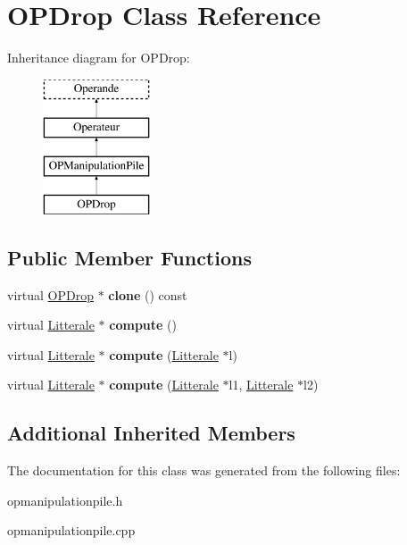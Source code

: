 \hypertarget{class_o_p_drop}{}\section{O\+P\+Drop Class Reference}
\label{class_o_p_drop}
Inheritance diagram for O\+P\+Drop\+:\begin{figure}[H]
\begin{center}
\leavevmode
\includegraphics[height=4.000000cm]{class_o_p_drop}
\end{center}
\end{figure}
\subsection*{Public Member Functions}
\begin{DoxyCompactItemize}
\item 
virtual \hyperlink{class_o_p_drop}{O\+P\+Drop} $\ast$ {\bfseries clone} () const \hypertarget{class_o_p_drop_a9023aab083de2456f6155bebeadbd9a7}{}\label{class_o_p_drop_a9023aab083de2456f6155bebeadbd9a7}

\item 
virtual \hyperlink{class_litterale}{Litterale} $\ast$ {\bfseries compute} ()\hypertarget{class_o_p_drop_a3f8df81126b25afda7e3fd98274e0a7a}{}\label{class_o_p_drop_a3f8df81126b25afda7e3fd98274e0a7a}

\item 
virtual \hyperlink{class_litterale}{Litterale} $\ast$ {\bfseries compute} (\hyperlink{class_litterale}{Litterale} $\ast$l)\hypertarget{class_o_p_drop_a95e2bc8070e5430ba7e94d3bb0f490d0}{}\label{class_o_p_drop_a95e2bc8070e5430ba7e94d3bb0f490d0}

\item 
virtual \hyperlink{class_litterale}{Litterale} $\ast$ {\bfseries compute} (\hyperlink{class_litterale}{Litterale} $\ast$l1, \hyperlink{class_litterale}{Litterale} $\ast$l2)\hypertarget{class_o_p_drop_a806a7c17d9a7bc8e5c4cba6314e65686}{}\label{class_o_p_drop_a806a7c17d9a7bc8e5c4cba6314e65686}

\end{DoxyCompactItemize}
\subsection*{Additional Inherited Members}


The documentation for this class was generated from the following files\+:\begin{DoxyCompactItemize}
\item 
opmanipulationpile.\+h\item 
opmanipulationpile.\+cpp\end{DoxyCompactItemize}
